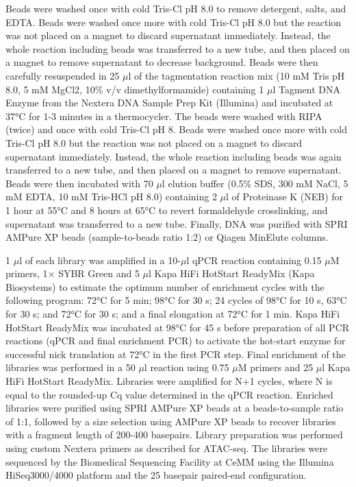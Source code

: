\documentclass[10pt,]{article}
\begin{document}
Beads were washed once with cold Tris-Cl pH 8.0 to remove detergent,
salts, and EDTA. Beads were washed once more with cold Tris-Cl pH 8.0
but the reaction was not placed on a magnet to discard supernatant
immediately. Instead, the whole reaction including beads was transferred
to a new tube, and then placed on a magnet to remove supernatant to
decrease background. Beads were then carefully resuspended in 25 $\mu$l
of the tagmentation reaction mix (10 mM Tris pH 8.0, 5 mM MgCl2, 10\%
v/v dimethylformamide) containing 1 $\mu$l Tagment DNA Enzyme from the
Nextera DNA Sample Prep Kit (Illumina) and incubated at 37°C for 1-3
minutes in a thermocycler. The beads were washed with RIPA (twice) and
once with cold Tris-Cl pH 8. Beads were washed once more with cold
Tris-Cl pH 8.0 but the reaction was not placed on a magnet to discard
supernatant immediately. Instead, the whole reaction including beads was
again transferred to a new tube, and then placed on a magnet to remove
supernatant. Beads were then incubated with 70 $\mu$l elution buffer
(0.5\% SDS, 300 mM NaCl, 5 mM EDTA, 10 mM Tris-HCl pH 8.0) containing 2
$\mu$l of Proteinase K (NEB) for 1 hour at 55°C and 8 hours at 65°C to
revert formaldehyde crosslinking, and supernatant was transferred to a
new tube. Finally, DNA was purified with SPRI AMPure XP beads
(sample-to-beads ratio 1:2) or Qiagen MinElute columns.

1 $\mu$l of each library was amplified in a 10-$\mu$l qPCR reaction
containing 0.15 $\mu$M primers, 1× SYBR Green and 5 $\mu$l Kapa HiFi
HotStart ReadyMix (Kapa Biosystems) to estimate the optimum number of
enrichment cycles with the following program: 72°C for 5 min; 98°C for
30 s; 24 cycles of 98°C for 10 s, 63°C for 30 s; and 72°C for 30 s; and
a final elongation at 72°C for 1 min. Kapa HiFi HotStart ReadyMix was
incubated at 98°C for 45 s before preparation of all PCR reactions (qPCR
and final enrichment PCR) to activate the hot-start enzyme for
successful nick translation at 72°C in the first PCR step. Final
enrichment of the libraries was performed in a 50 $\mu$l reaction using
0.75 $\mu$M primers and 25 $\mu$l Kapa HiFi HotStart ReadyMix. Libraries
were amplified for N+1 cycles, where N is equal to the rounded-up Cq
value determined in the qPCR reaction. Enriched libraries were purified
using SPRI AMPure XP beads at a beads-to-sample ratio of 1:1, followed
by a size selection using AMPure XP beads to recover libraries with a
fragment length of 200-400 basepairs. Library preparation was performed
using custom Nextera primers as described for
ATAC-seq\citep{Buenrostro2013}. The libraries were sequenced by the
Biomedical Sequencing Facility at CeMM using the Illumina HiSeq3000/4000
platform and the 25 basepair paired-end configuration.
\end{document}
